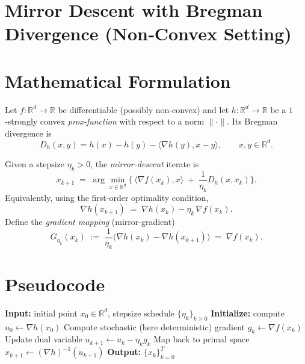 \documentclass{article}
\newcommand{\grad}{\nabla}
\newcommand{\Breg}{D_{h}}
\newcommand{\inner}[2]{\langle #1,#2\rangle}
\begin{document}
\section*{Mirror Descent with Bregman Divergence (Non‑Convex Setting)}

\section*{Mathematical Formulation}
Let $f:\mathbb{R}^{d}\rightarrow\mathbb{R}$ be differentiable (possibly non‑convex) and let $h:\mathbb{R}^{d}\rightarrow\mathbb{R}$ be a $1$‑strongly convex \emph{prox‑function} with respect to a norm $\|\cdot\|$.  
Its Bregman divergence is
\[
\Breg(x,y)=h(x)-h(y)-\inner{\grad h(y)}{x-y},\qquad x,y\in\mathbb{R}^{d}.
\]

Given a stepsize $\eta_{k}>0$, the \emph{mirror‑descent} iterate is
\begin{equation}\label{eq:update}
x_{k+1}
\;=\;\arg\min_{x\in\mathbb{R}^{d}}\Big\{\,\inner{\grad f(x_{k})}{x}\;+\;\frac{1}{\eta_{k}}\Breg(x,x_{k})\Big\}.
\end{equation}
Equivalently, using the first‑order optimality condition,
\begin{equation}\label{eq:optcond}
\grad h(x_{k+1}) \;=\; \grad h(x_{k}) - \eta_{k}\,\grad f(x_{k}). 
\end{equation}
Define the \emph{gradient mapping} (mirror‑gradient) 
\[
G_{\eta_{k}}(x_{k}) \;:=\; \frac{1}{\eta_{k}}\bigl(\grad h(x_{k})-\grad h(x_{k+1})\bigr)
\;=\; \grad f(x_{k}).
\]

\section*{Pseudocode}
\begin{algorithm}[H]
\caption{Mirror Descent for Non‑Convex Smooth $f$}
\begin{algorithmic}[1]
\State \textbf{Input:} initial point $x_{0}\in\mathbb{R}^{d}$, stepsize schedule $\{\eta_{k}\}_{k\ge 0}$
\State \textbf{Initialize:} compute $u_{0}\gets\grad h(x_{0})$
    \State Compute stochastic (here deterministic) gradient $g_{k}\gets \grad f(x_{k})$
    \State Update dual variable $u_{k+1}\gets u_{k}-\eta_{k} g_{k}$
    \State Map back to primal space $x_{k+1}\gets (\grad h)^{-1}(u_{k+1})$
\EndFor
\State \textbf{Output:} $\{x_{k}\}_{k=0}^{T}$
\end{algorithmic}
\end{algorithm}
\end{document}
